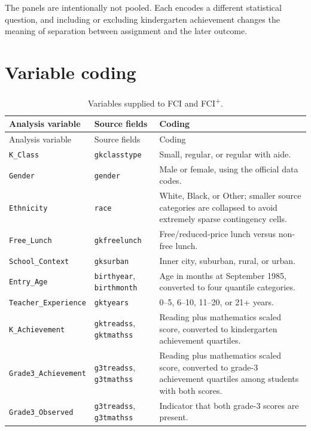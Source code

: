 \documentclass[11pt,a4paper,oneside]{report}
\renewcommand{\arraystretch}{1.16}
\newcommand{\FCIplus}{FCI\textsuperscript{+}}
\newcommand{\code}[1]{\texttt{#1}}
\begin{document}
The panels are intentionally not pooled. Each encodes a different statistical
question, and including or excluding kindergarten achievement changes the
meaning of separation between assignment and the later outcome.

\section{Variable coding}

\begingroup
\small
\renewcommand{\arraystretch}{1.05}
\begin{longtable}{p{}p{}p{}}
\caption{Variables supplied to FCI and \FCIplus{}.}
\label{tab:variables}\\
\toprule
Analysis variable & Source fields & Coding \\
\midrule
\endfirsthead
\toprule
Analysis variable & Source fields & Coding \\
\midrule
\endhead
\code{K\_Class} & \code{gkclasstype} &
Small, regular, or regular with aide. \\
\code{Gender} & \code{gender} &
Male or female, using the official data codes. \\
\code{Ethnicity} & \code{race} &
White, Black, or Other; smaller source categories are collapsed to avoid
extremely sparse contingency cells. \\
\code{Free\_Lunch} & \code{gkfreelunch} &
Free/reduced-price lunch versus non-free lunch. \\
\code{School\_Context} & \code{gksurban} &
Inner city, suburban, rural, or urban. \\
\code{Entry\_Age} & \code{birthyear}, \code{birthmonth} &
Age in months at September 1985, converted to four quantile categories. \\
\code{Teacher\_Experience} & \code{gktyears} &
0--5, 6--10, 11--20, or 21+ years. \\
\code{K\_Achievement} & \code{gktreadss}, \code{gktmathss} &
Reading plus mathematics scaled score, converted to kindergarten achievement
quartiles. \\
\code{Grade3\_Achievement} & \code{g3treadss}, \code{g3tmathss} &
Reading plus mathematics scaled score, converted to grade-3 achievement
quartiles among students with both scores. \\
\code{Grade3\_Observed} & \code{g3treadss}, \code{g3tmathss} &
Indicator that both grade-3 scores are present. \\
\bottomrule
\end{longtable}
\endgroup
\end{document}
